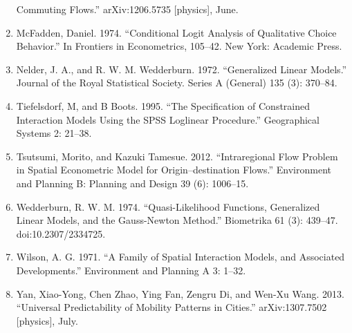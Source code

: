 \documentclass[11pt]{article}
\begin{document}
\begin{enumerate}
  Commuting Flows.'' arXiv:1206.5735 {[}physics{]}, June.
\item
  McFadden, Daniel. 1974. ``Conditional Logit Analysis of Qualitative
  Choice Behavior.'' In Frontiers in Econometrics, 105--42. New York:
  Academic Press.
\item
  Nelder, J. A., and R. W. M. Wedderburn. 1972. ``Generalized Linear
  Models.'' Journal of the Royal Statistical Society. Series A (General)
  135 (3): 370--84.
\item
  Tiefelsdorf, M, and B Boots. 1995. ``The Specification of Constrained
  Interaction Models Using the SPSS Loglinear Procedure.'' Geographical
  Systems 2: 21--38.
\item
  Tsutsumi, Morito, and Kazuki Tamesue. 2012. ``Intraregional Flow
  Problem in Spatial Econometric Model for Origin--destination Flows.''
  Environment and Planning B: Planning and Design 39 (6): 1006--15.
\item
  Wedderburn, R. W. M. 1974. ``Quasi-Likelihood Functions, Generalized
  Linear Models, and the Gauss-Newton Method.'' Biometrika 61 (3):
  439--47. doi:10.2307/2334725.
\item
  Wilson, A. G. 1971. ``A Family of Spatial Interaction Models, and
  Associated Developments.'' Environment and Planning A 3: 1--32.
\item
  Yan, Xiao-Yong, Chen Zhao, Ying Fan, Zengru Di, and Wen-Xu Wang. 2013.
  ``Universal Predictability of Mobility Patterns in Cities.''
  arXiv:1307.7502 {[}physics{]}, July.
\end{enumerate}


    
    
    
    
\end{document}
